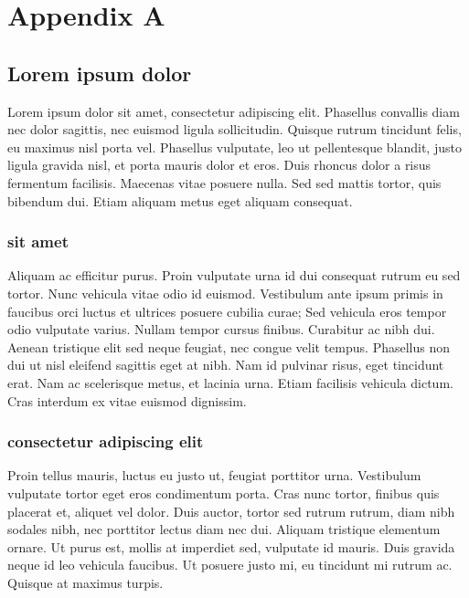 
\chapter{Appendix A}

\section{Lorem ipsum dolor}

 Lorem ipsum dolor sit amet, consectetur adipiscing elit. Phasellus convallis diam nec dolor sagittis, nec euismod ligula sollicitudin. Quisque rutrum tincidunt felis, eu maximus nisl porta vel. Phasellus vulputate, leo ut pellentesque blandit, justo ligula gravida nisl, et porta mauris dolor et eros. Duis rhoncus dolor a risus fermentum facilisis. Maecenas vitae posuere nulla. Sed sed mattis tortor, quis bibendum dui. Etiam aliquam metus eget aliquam consequat.

\subsection{sit amet}

Aliquam ac efficitur purus. Proin vulputate urna id dui consequat rutrum eu sed tortor. Nunc vehicula vitae odio id euismod. Vestibulum ante ipsum primis in faucibus orci luctus et ultrices posuere cubilia curae; Sed vehicula eros tempor odio vulputate varius. Nullam tempor cursus finibus. Curabitur ac nibh dui. Aenean tristique elit sed neque feugiat, nec congue velit tempus. Phasellus non dui ut nisl eleifend sagittis eget at nibh. Nam id pulvinar risus, eget tincidunt erat. Nam ac scelerisque metus, et lacinia urna. Etiam facilisis vehicula dictum. Cras interdum ex vitae euismod dignissim.

\subsection{consectetur adipiscing elit}

Proin tellus mauris, luctus eu justo ut, feugiat porttitor urna. Vestibulum vulputate tortor eget eros condimentum porta. Cras nunc tortor, finibus quis placerat et, aliquet vel dolor. Duis auctor, tortor sed rutrum rutrum, diam nibh sodales nibh, nec porttitor lectus diam nec dui. Aliquam tristique elementum ornare. Ut purus est, mollis at imperdiet sed, vulputate id mauris. Duis gravida neque id leo vehicula faucibus. Ut posuere justo mi, eu tincidunt mi rutrum ac. Quisque at maximus turpis.
